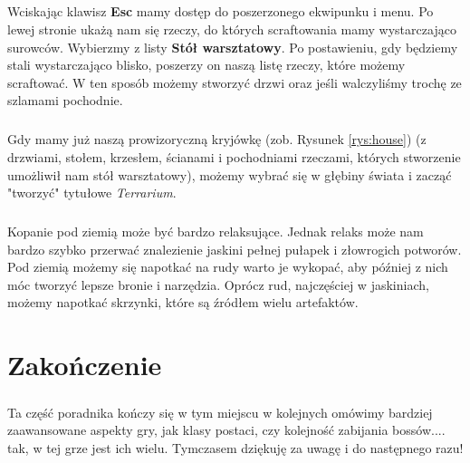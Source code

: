 \documentclass{report}
\begin{document}
\paragraph{} Wciskając klawisz \textbf{Esc} mamy dostęp do poszerzonego ekwipunku i menu. Po lewej stronie ukażą nam się rzeczy, do których scraftowania mamy wystarczająco surowców. Wybierzmy z listy \textbf{Stół warsztatowy}. Po postawieniu, gdy będziemy stali wystarczająco blisko, poszerzy on naszą listę rzeczy, które możemy scraftować. W ten sposób możemy stworzyć drzwi oraz \ppauza jeśli walczyliśmy trochę ze szlamami \ppauza pochodnie.
\paragraph{} Gdy mamy już naszą prowizoryczną kryjówkę (zob. Rysunek \ref{rys:house}) (z drzwiami, stołem, krzesłem, ścianami i pochodniami \ppauza rzeczami, których stworzenie umożliwił nam stół warsztatowy), możemy wybrać się w głębiny świata i zacząć "tworzyć" tytułowe \textit{Terrarium}.
\paragraph{} Kopanie pod ziemią może być bardzo relaksujące. Jednak relaks może nam bardzo szybko przerwać znalezienie jaskini pełnej pułapek i złowrogich potworów. Pod ziemią możemy się napotkać na rudy \ppauza warto je wykopać, aby później z nich móc tworzyć lepsze bronie i narzędzia. Oprócz rud, najczęściej w jaskiniach, możemy napotkać skrzynki, które są źródłem wielu artefaktów.
\chapter*{Zakończenie}
\paragraph{} Ta część poradnika kończy się w tym miejscu \ppauza w kolejnych omówimy bardziej zaawansowane aspekty gry, jak klasy postaci, czy kolejność zabijania bossów.... tak, w tej grze jest ich wielu. Tymczasem dziękuję za uwagę i do następnego razu!
\end{document}
